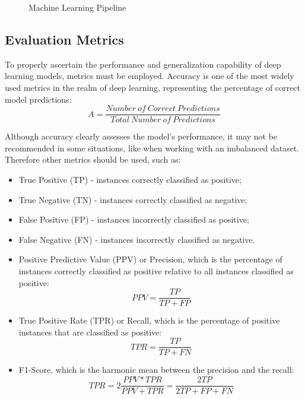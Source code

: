 \begin{figure}[H]%
    \centering
    
    \caption{Machine Learning Pipeline}
    \label{fig:ml_pipeline}
\end{figure}

\subsection{Evaluation Metrics}

To properly ascertain the performance and generalization capability of deep learning models, metrics must be employed. Accuracy is one of the most widely used metrics in the realm of deep learning, representing the percentage of correct model predictions: \begin{equation}A=\frac{Number\ of\ Correct\ Predictions}{Total\ Number\ of\ Predictions}\label{eq:acc}\end{equation}

Although accuracy clearly assesses the model's performance, it may not be recommended in some situations, like when working with an imbalanced dataset. Therefore other metrics should be used, such as:

\begin{itemize}
    \item True Positive (TP) - instances correctly classified as positive;
    \item True Negative (TN) - instances correctly classified as negative;
    \item False Positive (FP) - instances incorrectly classified as positive;
    \item False Negative (FN) - instances incorrectly classified as negative.
    \item Positive Predictive Value (PPV) or Precision, which is the percentage of instances correctly classified as positive relative to all instances classified as positive: \begin{equation}PPV=\frac{TP}{TP+FP}\label{eq:ppv}\end{equation}
    \item True Positive Rate (TPR) or Recall, which is the percentage of positive instances that are classified as positive: \begin{equation}TPR=\frac{TP}{TP+FN}\label{eq:tpr}\end{equation}
    \item F1-Score, which is the harmonic mean between the precision and the recall: \begin{equation}TPR=2\frac{PPV*TPR}{PPV+TPR}=\frac{2TP}{2TP+FP+FN}\label{eq:f1-score}\end{equation}
\end{itemize}

